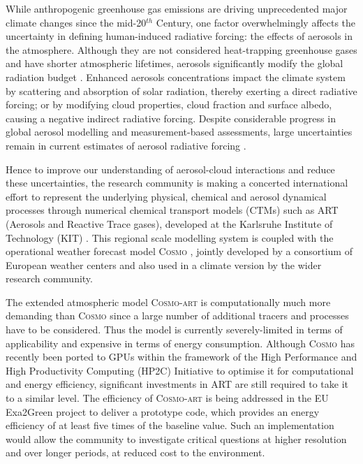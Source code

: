 While anthropogenic greenhouse gas emissions are driving unprecedented
major  climate  changes  since   the  mid-20$^{th}$  Century,  one  factor
overwhelmingly  affects  the  uncertainty  in  defining  human-induced
radiative  forcing:  the  effects   of  aerosols  in  the  atmosphere.
Although they  are not considered  heat-trapping greenhouse  gases and
have  shorter  atmospheric lifetimes,  aerosols  significantly modify  the
global   radiation   budget   \citep{IPCC-2013}.   Enhanced   aerosols
concentrations impact the climate  system by scattering and absorption
of solar radiation, thereby exerting a direct radiative forcing; or by
modifying cloud  properties,  cloud  fraction and  surface
albedo,  causing  a  negative  indirect  radiative  forcing.   Despite
considerable  progress in  global aerosol  modelling \citep{Mann-2013}
and  measurement-based  assessments,  large  uncertainties  remain  in
current  estimates  of  aerosol radiative  forcing  \citep{Myhre-2013,
IPCC-2013,  Lee-2013,   Randles-2013,  Rosenfeld-2013,  Sherwood-2013,
Stier-2013}.

Hence to  improve our understanding of  aerosol-cloud interactions and
reduce  these  uncertainties,  the  research  community  is  making  a
concerted international  effort to represent  the underlying physical,
chemical  and aerosol dynamical  processes through  numerical chemical
transport  models (CTMs)  such  as ART  (Aerosols  and Reactive  Trace
gases),   developed   at  the   Karlsruhe   Institute  of   Technology
(KIT)  \citep{Vogel-2009,  Bangert-2011,  Knote-2013}.  This  regional
scale modelling system is coupled  with the operational  weather forecast
model  \textsc{Cosmo}  \citep{Baldauf-2011},  jointly developed  by  a
consortium of European weather centers and also used in a climate version
by the wider research community.

The extended  atmospheric model \textsc{Cosmo-art}  is com\-put\-ationally
much  more  demanding than  \textsc{Cosmo}  since  a  large number  of
additional  tracers and  processes have  to be  considered.   Thus the
model  is currently  severely-limited  in terms  of applicability  and
expensive in terms of energy consumption.  Although \textsc{Cosmo} has
recently been ported to GPUs \citep{Gysi-2014, Lapillonne-2014} within
the framework of the  High Performance and High Productivity Computing
(HP2C) Initiative  \citep{HP2C} to optimise it  for computational and
energy efficiency,  significant investments in ART  are still required
to take it  to a similar level.  The  efficiency of \textsc{Cosmo-art}
is being  addressed in the  EU Exa2Green project  \citep{EXA2GREEN} to
deliver a  prototype code, which  provides an energy efficiency  of at
least five times of the  baseline value.  Such an implementation would
allow  the  community  to  investigate critical  questions  at  higher
resolution  and   over  longer  periods,   at  reduced  cost   to  the
environment.

